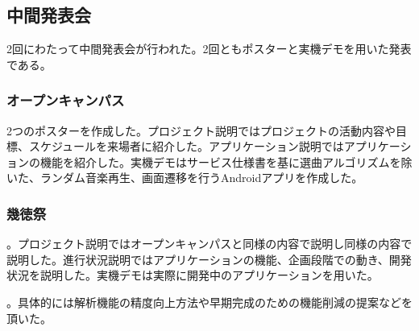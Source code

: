 \subsection{中間発表会}
2回にわたって中間発表会が行われた。2回ともポスターと実機デモを用いた発表である。

\subsubsection{オープンキャンパス}
2つのポスターを作成した。プロジェクト説明ではプロジェクトの活動内容や目標、スケジュールを来場者に紹介した。アプリケーション説明ではアプリケーションの機能を紹介した。実機デモはサービス仕様書を基に選曲アルゴリズムを除いた、ランダム音楽再生、画面遷移を行うAndroidアプリを作成した。

\subsubsection{幾徳祭}
。プロジェクト説明ではオープンキャンパスと同様の内容で説明し同様の内容で説明した。進行状況説明ではアプリケーションの機能、企画段階での動き、開発状況を説明した。実機デモは実際に開発中のアプリケーションを用いた。

。具体的には解析機能の精度向上方法や早期完成のための機能削減の提案などを頂いた。
